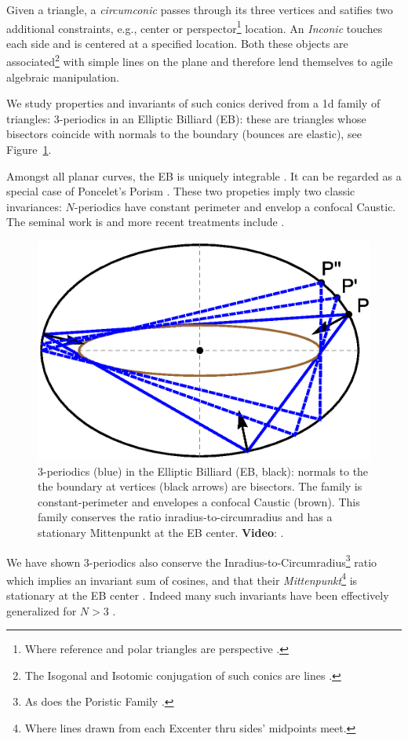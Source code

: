Given a triangle, a {\em circumconic} passes through its three vertices and satifies two additional constraints, e.g., center or perspector\footnote{Where reference and polar triangles are perspective \cite{mw}.} location. An {\em Inconic} touches each side and is centered at a specified location. Both these objects are associated\footnote{The Isogonal and Isotomic conjugation of such conics are lines \cite[Perspector]{mw}.} with simple lines on the plane \cite[Circumconic,Inconic]{mw} and therefore lend themselves to agile algebraic manipulation.

We study properties and invariants of such conics derived from a 1d family of triangles: 3-periodics in an Elliptic Billiard (EB): these are triangles whose bisectors coincide with normals to the boundary (bounces are elastic), see Figure~\ref{fig:three-orbits-proof}.

Amongst all planar curves, the EB is uniquely integrable \cite{kaloshin2018}. It can be regarded as a special case of Poncelet's Porism \cite{dragovic11}. These two propeties imply two classic invariances: $N$-periodics have constant perimeter and envelop a confocal Caustic. The seminal work is \cite{sergei91} and more recent treatments include \cite{lynch2019-billiards,rozikov2018}. 

\begin{figure}[H]
    \centering
    \includegraphics[width=.66\textwidth]{pics_eps_new/0090_three_orbits_proofs.eps}
    \caption{3-periodics (blue) in the Elliptic Billiard (EB, black): normals to the the boundary at vertices (black arrows) are bisectors. The family is constant-perimeter and envelopes a confocal Caustic (brown). This family conserves the ratio inradius-to-circumradius and has a stationary Mittenpunkt at the EB center. \textbf{Video}: \cite[PL\#01]{reznik2020-playlist-circum}.}
    \label{fig:three-orbits-proof}
\end{figure}

We have shown 3-periodics also conserve the Inradius-to-Circumradius\footnote{As does the Poristic Family \cite{gallatly1914-geometry}.} ratio which implies an invariant sum of cosines, and that their {\em Mittenpunkt}\footnote{Where lines drawn from each Excenter thru sides' midpoints meet.} is stationary at the EB center \cite{reznik2020-intelligencer}. Indeed many such invariants have been effectively generalized for $N>3$ \cite{akopyan2020-invariants,bialy2020-invariants}.

